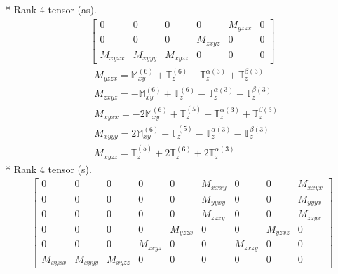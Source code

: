 \documentclass[fleqn,8pt,landscape]{jsarticle}
\begin{document}
* Rank 4 tensor (as).
\begin{align*}
\begin{bmatrix} 0 & 0 & 0 & 0 & M_{yzzx} & 0 \\ 0 & 0 & 0 & M_{zxyz} & 0 & 0 \\ M_{xyxx} & M_{xyyy} & M_{xyzz} & 0 & 0 & 0 \end{bmatrix}
\end{align*}
\begin{align*}
& M_{yzzx} = \mathbb{M}_{xy}^{(6)} + \mathbb{T}_{z}^{(6)} - \mathbb{T}_{z}^{\alpha(3)} + \mathbb{T}_{z}^{\beta(3)} \\
& M_{zxyz} = - \mathbb{M}_{xy}^{(6)} + \mathbb{T}_{z}^{(6)} - \mathbb{T}_{z}^{\alpha(3)} - \mathbb{T}_{z}^{\beta(3)} \\
& M_{xyxx} = - 2 \mathbb{M}_{xy}^{(6)} + \mathbb{T}_{z}^{(5)} - \mathbb{T}_{z}^{\alpha(3)} + \mathbb{T}_{z}^{\beta(3)} \\
& M_{xyyy} = 2 \mathbb{M}_{xy}^{(6)} + \mathbb{T}_{z}^{(5)} - \mathbb{T}_{z}^{\alpha(3)} - \mathbb{T}_{z}^{\beta(3)} \\
& M_{xyzz} = \mathbb{T}_{z}^{(5)} + 2 \mathbb{T}_{z}^{(6)} + 2 \mathbb{T}_{z}^{\alpha(3)}
\end{align*}
* Rank 4 tensor (s).
\begin{align*}
\begin{bmatrix} 0 & 0 & 0 & 0 & 0 & M_{xxxy} & 0 & 0 & M_{xxyx} \\ 0 & 0 & 0 & 0 & 0 & M_{yyxy} & 0 & 0 & M_{yyyx} \\ 0 & 0 & 0 & 0 & 0 & M_{zzxy} & 0 & 0 & M_{zzyx} \\ 0 & 0 & 0 & 0 & M_{yzzx} & 0 & 0 & M_{yzxz} & 0 \\ 0 & 0 & 0 & M_{zxyz} & 0 & 0 & M_{zxzy} & 0 & 0 \\ M_{xyxx} & M_{xyyy} & M_{xyzz} & 0 & 0 & 0 & 0 & 0 & 0 \end{bmatrix}
\end{align*}
\end{document}
